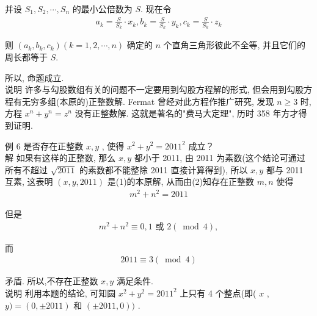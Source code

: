 并设 $S_{1}, S_{2}, \cdots, S_{n}$ 的最小公倍数为 $S$. 现在令
\begin{align*}
	a_{k}=\frac{S}{S_{k}} \cdot x_{k}, b_{k}=\frac{S}{S_{k}} \cdot y_{k}, c_{k}=\frac{S}{S_{k}} \cdot z_{k}
\end{align*}

则 $\left(a_{k}, b_{k}, c_{k}\right)(k=1,2, \cdots, n)$ 确定的 $n$ 个直角三角形彼此不全等, 并且它们的周长都等于 $S$.

所以, 命题成立. \\
说明 许多与勾股数组有关的问题不一定要用到勾股方程解的形式, 但会用到勾股方程有无穷多组(本原的)正整数解.  Fermat 曾经对此方程作推广研究, 发现 $n \geqslant 3$ 时, 方程 $x^{n}+y^{n}=z^{n}$ 没有正整数解. 这就是著名的"费马大定理", 历时 358 年方才得到证明.

例 6 是否存在正整数 $x ,  y$ , 使得 $x^{2}+y^{2}=2011^{2}$ 成立？\\
解 如果有这样的正整数, 那么 $x ,  y$ 都小于 2011, 由 2011 为素数(这个结论可通过所有不超过 $\sqrt{2011}$ 的素数都不能整除 2011 直接计算得到), 所以 $x ,  y$ 都与 2011 互素, 这表明 $(x, y, 2011)$ 是(1)的本原解, 从而由(2)知存在正整数 $m ,  n$ 使得
\begin{align*}
	m^{2}+n^{2}=2011
\end{align*}

但是
\begin{align*}
	m^{2}+n^{2} \equiv 0 ,  1 \text { 或 } 2(\bmod 4),
\end{align*}

而
\begin{align*}
	2011 \equiv 3(\bmod 4)
\end{align*}

矛盾. 所以,不存在正整数 $x ,  y$ 满足条件.\\
说明 利用本题的结论, 可知圆 $x^{2}+y^{2}=2011^{2}$ 上只有 4 个整点(即( $x$ ,  $y)=(0, \pm 2011)$ 和 $( \pm 2011,0))$ .
